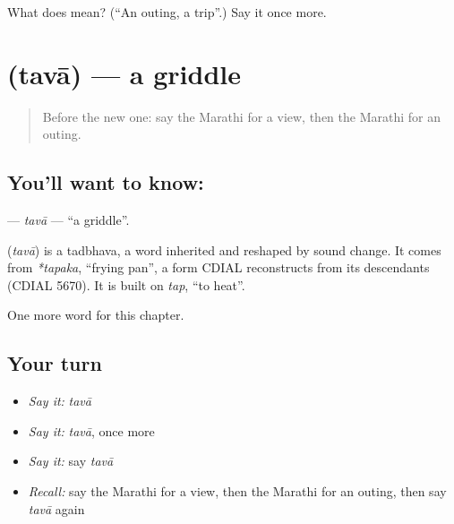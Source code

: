 \begin{tcolorbox}[breakable,colback=teal!4,colframe=teal!35!black,title={Before you move on}]
What does  mean? (\textquotedblleft{}An outing, a trip\textquotedblright{}.) Say it once more.
\end{tcolorbox}
\section[\texorpdfstring{\mr{तवा} (tavā)}{तवा (tavā)}]{ (tavā) — a griddle}

\label{lesson:MR-C243-tava}



\begin{quote}
Before the new one: say the Marathi for a view, then the Marathi for an outing.
\end{quote}

\subsection*{You'll want to know: }
\textbf{} — \emph{tavā} — \textquotedblleft{}a griddle\textquotedblright{}.

\begin{cousinweb}
\textbf{} (\emph{tavā}) is a tadbhava, a word inherited and reshaped by sound change. It comes from \emph{*tapaka}, \textquotedblleft{}frying pan\textquotedblright{}, a form CDIAL reconstructs from its descendants (CDIAL 5670). It is built on \emph{tap}, \textquotedblleft{}to heat\textquotedblright{}.
\end{cousinweb}

\begin{grammarlens}[title={What you've built}]
One more word for this chapter.
\end{grammarlens}

\subsection*{Your turn}
\begin{itemize}
\raggedright
  \item \emph{Say it:} \emph{tavā}
  \item \emph{Say it:} \emph{tavā}, once more
  \item \emph{Say it:} say \emph{tavā}
  \item \emph{Recall:} say the Marathi for a view, then the Marathi for an outing, then say \emph{tavā} again
\end{itemize}


